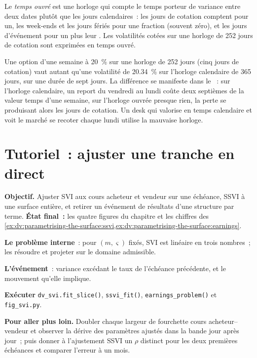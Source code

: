 \begin{definition}\label{def:dv:parametrising-the-surface:business}
Le \emph{temps ouvré} est une horloge qui compte le temps porteur de variance entre
deux dates plutôt que les jours calendaires~: les jours de cotation comptent pour un, les week-ends et les jours fériés pour une fraction (souvent
zéro), et les jours d'événement pour un plus leur . Les volatilités cotées sur une horloge de 252 jours de cotation
sont exprimées en temps ouvré.
\end{definition}

Une option d'une semaine à 20~\% sur une horloge de 252 jours (cinq jours de cotation) vaut autant qu'une volatilité de 20.34~\%
sur l'horloge calendaire de 365 jours, sur une durée de sept jours. La différence se manifeste dans le ~: sur l'horloge calendaire, un report
du vendredi au lundi coûte deux septièmes de la valeur temps d'une semaine, sur l'horloge ouvrée presque
rien, la perte se produisant alors les jours de cotation. Un desk qui valorise en temps calendaire et
voit le marché se recoter chaque lundi utilise la mauvaise horloge.

\section{Tutoriel~: ajuster une tranche en direct}\label{tut:dv:parametrising-the-surface:tut}

\begin{tutorial}
\textbf{Objectif.} Ajuster SVI aux cours acheteur et vendeur sur une échéance, SSVI à une surface entière, et retirer un événement de résultats
d'une structure par terme. \textbf{État final~:} les quatre figures du chapitre et les chiffres des
\cref{ex:dv:parametrising-the-surface:ssvi,ex:dv:parametrising-the-surface:earnings}.
\begin{tutsteps}
\item \textbf{Le problème interne}~: pour $(m,\varsigma)$ fixés, SVI est linéaire en trois nombres~; les résoudre et
projeter sur le domaine admissible.
\label{lst:dv:parametrising-the-surface:inner}
\item \textbf{L'événement}~: variance excédant le taux de l'échéance précédente, et le mouvement qu'elle implique.
\label{lst:dv:parametrising-the-surface:event}
\item \textbf{Exécuter} \texttt{dv\_svi.fit\_slice()}, \texttt{ssvi\_fit()}, \texttt{earnings\_problem()}
et \texttt{fig\_svi.py}.
\end{tutsteps}
\textbf{Pour aller plus loin.} Doubler chaque largeur de fourchette cours acheteur--vendeur et observer la dérive des paramètres ajustés dans
la bande jour après jour~; puis donner à l'ajustement SSVI un $\rho$ distinct pour les deux premières échéances et
comparer l'erreur à un mois.
\end{tutorial}

